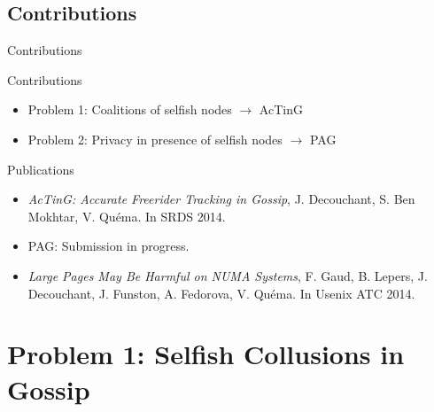 \documentclass[10pt]{beamer}
\begin{document}
\subsection{Contributions}
\begin{frame}{Contributions}{}

  \begin{block}{Contributions}
     \begin{itemize}
        \item Problem 1: Coalitions of selfish nodes $\longrightarrow$ AcTinG
        \item Problem 2: Privacy in presence of selfish nodes $\longrightarrow$ PAG
     \end{itemize}
  \end{block}  
  \vfill
   \begin{block}{Publications}
      \begin{itemize}
         \item \textit{AcTinG: Accurate Freerider Tracking in Gossip}, J. Decouchant, S. Ben Mokhtar, V. Quéma. In SRDS 2014. 
         \item PAG: Submission in progress. 
         \vspace{0.5cm}
         \item \textit{Large  Pages May   Be Harmful  on NUMA  Systems}, F. Gaud, B. Lepers, J. Decouchant, J. Funston, A. Fedorova, V. Quéma. In Usenix ATC 2014. 
      \end{itemize}
  \end{block}

\end{frame}


\section{Problem 1: Selfish Collusions in Gossip}
\end{document}
